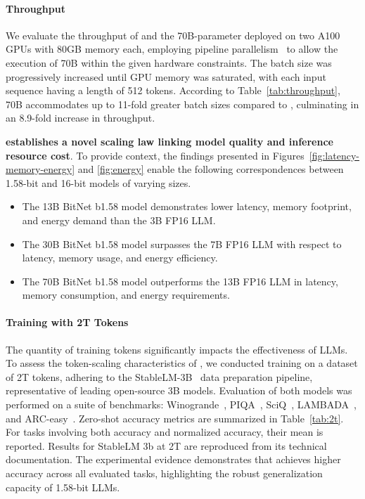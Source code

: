 \paragraph{Throughput}

We evaluate the throughput of  and the 70B-parameter  deployed on two A100 GPUs with 80GB memory each, employing pipeline parallelism~\cite{gpipe} to allow the execution of  70B within the given hardware constraints. The batch size was progressively increased until GPU memory was saturated, with each input sequence having a length of 512 tokens. According to Table~\ref{tab:throughput},  70B accommodates up to 11-fold greater batch sizes compared to , culminating in an 8.9-fold increase in throughput.

\textbf{ establishes a novel scaling law linking model quality and inference resource cost}. To provide context, the findings presented in Figures~\ref{fig:latency-memory-energy} and \ref{fig:energy} enable the following correspondences between 1.58-bit and 16-bit models of varying sizes.

\begin{itemize}
    \item The 13B BitNet b1.58 model demonstrates lower latency, memory footprint, and energy demand than the 3B FP16 LLM.
    \item The 30B BitNet b1.58 model surpasses the 7B FP16 LLM with respect to latency, memory usage, and energy efficiency.
    \item The 70B BitNet b1.58 model outperforms the 13B FP16 LLM in latency, memory consumption, and energy requirements.
\end{itemize}

\paragraph{Training with 2T Tokens}

The quantity of training tokens significantly impacts the effectiveness of LLMs. To assess the token-scaling characteristics of , we conducted training on a dataset of 2T tokens, adhering to the StableLM-3B~\cite{StableLM-3B-4E1T} data preparation pipeline, representative of leading open-source 3B models. Evaluation of both models was performed on a suite of benchmarks: Winogrande~\cite{winoGrande}, PIQA~\cite{piqa}, SciQ~\cite{sciq}, LAMBADA~\cite{lambada}, and ARC-easy~\cite{arc}. Zero-shot accuracy metrics are summarized in Table~\ref{tab:2t}. For tasks involving both accuracy and normalized accuracy, their mean is reported. Results for StableLM 3b at 2T are reproduced from its technical documentation. The experimental evidence demonstrates that  achieves higher accuracy across all evaluated tasks, highlighting the robust generalization capacity of 1.58-bit LLMs.


